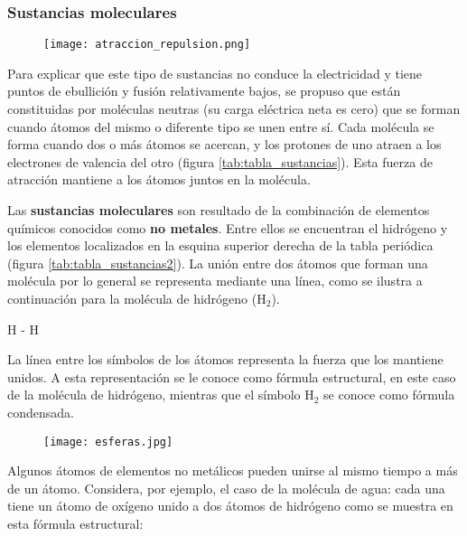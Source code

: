 \subsubsection{Sustancias moleculares}

\begin{figure}[H]
    \centering
    \texttt{[image: atraccion\_repulsion.png]}
    \label{fig:atraccion_repulsion}
\end{figure}

Para explicar que este tipo de sustancias no conduce la electricidad y tiene puntos de
ebullición y fusión relativamente bajos, se propuso que están constituidas por moléculas
neutras (su carga eléctrica neta es cero) que se forman cuando átomos del mismo o diferente
tipo se unen entre sí. Cada molécula se forma cuando dos o más átomos se acercan, y los
protones de uno atraen a los electrones de valencia del otro (figura \ref{tab:tabla_sustancias}). Esta fuerza
de atracción mantiene a los átomos juntos en la molécula.

Las \textbf{sustancias moleculares} son resultado de la combinación de elementos químicos conocidos
como \textbf{no metales}. Entre ellos se encuentran el hidrógeno y los elementos localizados en la
esquina superior derecha de la tabla periódica (figura \ref{tab:tabla_sustancias2}).
La unión entre dos átomos que forman una molécula por lo general se representa mediante
una línea, como se ilustra a continuación para la molécula de hidrógeno (H$_2$).

\begin{center}
    H - H
\end{center}

La línea entre los símbolos de los átomos representa la fuerza que los mantiene unidos.
A esta representación se le conoce como fórmula estructural, en este caso de la molécula
de hidrógeno, mientras que el símbolo H$_2$ se conoce como fórmula condensada.

\begin{figure}[H]
    \centering
    \texttt{[image: esferas.jpg]}
    \label{fig:esferas}
\end{figure}

Algunos átomos de elementos no metálicos pueden unirse al mismo tiempo a más de un átomo.
Considera, por ejemplo, el caso de la molécula de agua: cada una tiene un átomo de oxígeno
unido a dos átomos de hidrógeno como se muestra en esta fórmula estructural:


